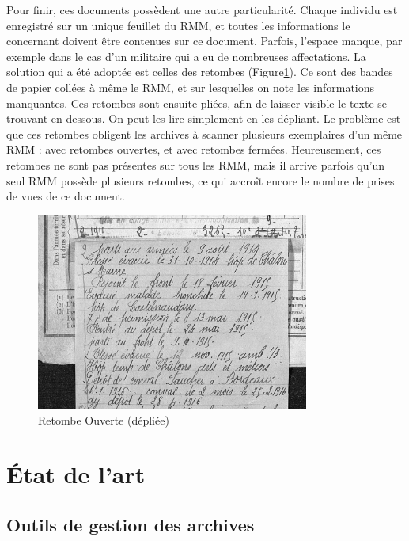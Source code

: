 \documentclass[a4paper]{article}
\begin{document}
	Pour finir, ces documents poss\`edent une autre particularit\'e. Chaque individu est enregistr\'e sur un unique feuillet du RMM, et toutes les informations le concernant doivent \^etre contenues sur ce document. Parfois, l'espace manque, par exemple dans le cas d'un militaire qui a eu de nombreuses affectations. La solution qui a \'et\'e adopt\'ee est celles des retombes (Figure\ref{fig:retombe}). Ce sont des bandes de papier coll\'ees \`a m\^eme le RMM, et sur lesquelles on note les informations manquantes. Ces retombes sont ensuite pli\'ees, afin de laisser visible le texte se trouvant en dessous. On peut les lire simplement en les d\'epliant. Le probl\`eme est que ces retombes obligent les archives \`a scanner plusieurs exemplaires d'un m\^eme RMM : avec retombes ouvertes, et avec retombes ferm\'ees. Heureusement, ces retombes ne sont pas pr\'esentes sur tous les RMM, mais il arrive parfois qu'un seul RMM poss\`ede plusieurs retombes, ce qui accro\^it encore le nombre de prises de vues de ce document.
    
\begin{figure}[H]
\centering
\includegraphics[width=0.8\textwidth]{RetombeOuverte_2.PNG}
\caption{\label{fig:retombe}Retombe Ouverte (d\'epli\'ee)}
\end{figure}
     
     
   

\section{\'Etat de l'art}
\label{sec:etatArt}

\subsection{Outils de gestion des archives}
\label{subsec:outils}
\end{document}
